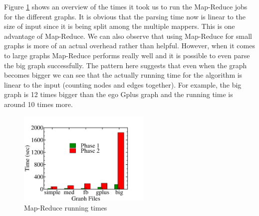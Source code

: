 Figure \ref{fig:mapreduce_graph} shows an overview of the times it took us to run the Map-Reduce jobs for the different graphs. It is obvious that the parsing time now is linear to the size of input since it is being split among the multiple mappers. This is one advantage of Map-Reduce. We can also observe that using Map-Reduce for small graphs is more of an actual overhead rather than helpful. However, when it comes to large graphs Map-Reduce performs really well and it is possible to even parse the big graph successfully. The pattern here suggests that even when the graph becomes bigger we can see that the actually running time for the algorithm is linear to the input (counting nodes and edges together). For example, the big graph is 12 times bigger than the ego Gplus graph and the running time is around 10 times more.

\begin{figure}[!h]
 \centering
    \includegraphics[width=15pc]{figures/mapreduce_graph.pdf}
	\caption{Map-Reduce running times}
    \label{fig:mapreduce_graph}
\end{figure}

